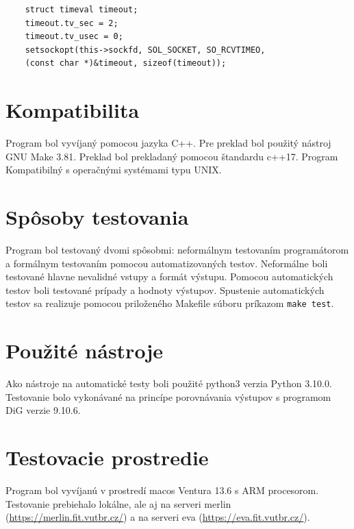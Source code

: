 \begin{verbatim}
    struct timeval timeout;
    timeout.tv_sec = 2;
    timeout.tv_usec = 0;
    setsockopt(this->sockfd, SOL_SOCKET, SO_RCVTIMEO, 
    (const char *)&timeout, sizeof(timeout));
\end{verbatim}

\section{Kompatibilita}
\label{Kompatibilita}
Program bol vyvíjaný pomocou jazyka C++. Pre preklad bol použitý nástroj GNU Make 3.81. Preklad bol prekladaný pomocou štandardu c++17.
Program Kompatibilný s operačnými systémami typu UNIX. 


\section{Spôsoby testovania}
\label{Spôsoby testovania}
Program bol testovaný dvomi spôsobmi: neformálnym testovaním programátorom a formálnym testovaním pomocou automatizovaných testov.
Neformálne boli testované hlavne nevalidné vstupy a formát výstupu. 
Pomocou automatických testov boli testované prípady a hodnoty výstupov. Spustenie automatických testov sa realizuje pomocou priloženého Makefile súboru príkazom \verb|make test|.

\section{Použité nástroje}
\label{Použité nástroje}
Ako nástroje na automatické testy boli použité python3 verzia Python 3.10.0. Testovanie bolo vykonávané na princípe 
porovnávania výstupov s programom DiG verzie 9.10.6.

\section{Testovacie prostredie}
\label{Testovacaie prostrede}
Program bol vyvíjanú v prostredí macos Ventura 13.6 s ARM procesorom. Testovanie prebiehalo lokálne, ale aj 
na serveri merlin (\url{https://merlin.fit.vutbr.cz/}) a na serveri eva (\url{https://eva.fit.vutbr.cz/}).




